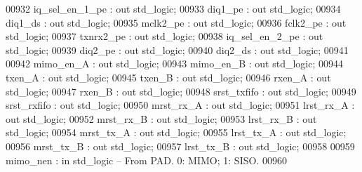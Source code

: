 \begin{DoxyCode}
00932         iq\_sel\_en\_1\_pe  : \textcolor{keywordflow}{out} \textcolor{comment}{std\_logic};
00933         diq1\_pe             : \textcolor{keywordflow}{out} \textcolor{comment}{std\_logic};
00934         diq1\_ds             : \textcolor{keywordflow}{out} \textcolor{comment}{std\_logic};
00935         mclk2\_pe                : \textcolor{keywordflow}{out} \textcolor{comment}{std\_logic};
00936         fclk2\_pe                : \textcolor{keywordflow}{out} \textcolor{comment}{std\_logic};
00937         txnrx2\_pe               : \textcolor{keywordflow}{out} \textcolor{comment}{std\_logic};
00938         iq\_sel\_en\_2\_pe  : \textcolor{keywordflow}{out} \textcolor{comment}{std\_logic};
00939         diq2\_pe             : \textcolor{keywordflow}{out} \textcolor{comment}{std\_logic};
00940         diq2\_ds             : \textcolor{keywordflow}{out} \textcolor{comment}{std\_logic};
00941         
00942         mimo\_en\_A       : \textcolor{keywordflow}{out} \textcolor{comment}{std\_logic};
00943         mimo\_en\_B       : \textcolor{keywordflow}{out} \textcolor{comment}{std\_logic};
00944         txen\_A          : \textcolor{keywordflow}{out} \textcolor{comment}{std\_logic};
00945         txen\_B          : \textcolor{keywordflow}{out} \textcolor{comment}{std\_logic};
00946         rxen\_A          : \textcolor{keywordflow}{out} \textcolor{comment}{std\_logic};
00947         rxen\_B          : \textcolor{keywordflow}{out} \textcolor{comment}{std\_logic};
00948         srst\_txfifo : \textcolor{keywordflow}{out} \textcolor{comment}{std\_logic};
00949         srst\_rxfifo : \textcolor{keywordflow}{out} \textcolor{comment}{std\_logic};
00950         mrst\_rx\_A       : \textcolor{keywordflow}{out} \textcolor{comment}{std\_logic};
00951         lrst\_rx\_A       : \textcolor{keywordflow}{out} \textcolor{comment}{std\_logic};
00952         mrst\_rx\_B       : \textcolor{keywordflow}{out} \textcolor{comment}{std\_logic};
00953         lrst\_rx\_B       : \textcolor{keywordflow}{out} \textcolor{comment}{std\_logic};
00954         mrst\_tx\_A       : \textcolor{keywordflow}{out} \textcolor{comment}{std\_logic};
00955         lrst\_tx\_A       : \textcolor{keywordflow}{out} \textcolor{comment}{std\_logic};
00956         mrst\_tx\_B       : \textcolor{keywordflow}{out} \textcolor{comment}{std\_logic};
00957         lrst\_tx\_B       : \textcolor{keywordflow}{out} \textcolor{comment}{std\_logic};
00958         
00959         mimo\_nen        : \textcolor{keywordflow}{in} \textcolor{comment}{std\_logic}\textcolor{keyword}{  -- From PAD. 0: MIMO; 1: SISO.}
00960 

\end{DoxyCode}
